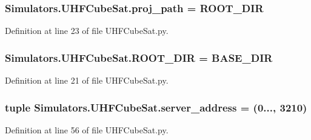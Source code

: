 \subsubsection[{proj\+\_\+path}]{\setlength{\rightskip}{0pt plus 5cm}Simulators.\+U\+H\+F\+Cube\+Sat.\+proj\+\_\+path = {\bf R\+O\+O\+T\+\_\+\+D\+I\+R}}\label{namespace_simulators_1_1_u_h_f_cube_sat_a8061636f761f08164b8ca45c2ef477a8}


Definition at line 23 of file U\+H\+F\+Cube\+Sat.\+py.

\hypertarget{namespace_simulators_1_1_u_h_f_cube_sat_ae324f329fb5abe42b2d8bf2faad07d2a}{}
\subsubsection[{R\+O\+O\+T\+\_\+\+D\+I\+R}]{\setlength{\rightskip}{0pt plus 5cm}Simulators.\+U\+H\+F\+Cube\+Sat.\+R\+O\+O\+T\+\_\+\+D\+I\+R = {\bf B\+A\+S\+E\+\_\+\+D\+I\+R}}\label{namespace_simulators_1_1_u_h_f_cube_sat_ae324f329fb5abe42b2d8bf2faad07d2a}


Definition at line 21 of file U\+H\+F\+Cube\+Sat.\+py.

\hypertarget{namespace_simulators_1_1_u_h_f_cube_sat_abb8434d05f5893653d27801880fa167d}{}
\subsubsection[{server\+\_\+address}]{\setlength{\rightskip}{0pt plus 5cm}tuple Simulators.\+U\+H\+F\+Cube\+Sat.\+server\+\_\+address = (\textquotesingle{}0...\textquotesingle{}, 3210)}\label{namespace_simulators_1_1_u_h_f_cube_sat_abb8434d05f5893653d27801880fa167d}


Definition at line 56 of file U\+H\+F\+Cube\+Sat.\+py.

\hypertarget{namespace_simulators_1_1_u_h_f_cube_sat_ab0affb04a9081bd0b75db4400d92fa2e}{}
